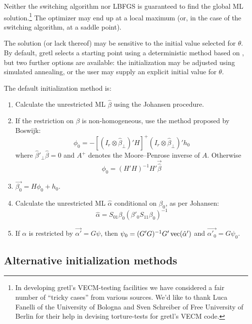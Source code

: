 Neither the switching algorithm nor LBFGS is guaranteed to find the
global ML solution.\footnote{In developing gretl's VECM-testing
facilities we have considered a fair number of ``tricky cases'' from
various sources. We'd like to thank Luca Fanelli of the University of
Bologna and Sven Schreiber of Free University of Berlin for their help
in devising torture-tests for gretl's VECM code.} The optimizer may
end up at a local maximum (or, in the case of the switching algorithm,
at a saddle point).

The solution (or lack thereof) may be sensitive to the initial value
selected for $\theta$.  By default, gretl selects a starting
point using a deterministic method based on \cite{boswijk95}, but two
further options are available: the initialization may be adjusted
using simulated annealing, or the user may supply an explicit initial
value for $\theta$.

The default initialization method is:
%
\begin{enumerate}
\item Calculate the unrestricted ML $\hat{\beta}$ using the
  Johansen procedure.
\item If the restriction on $\beta$ is non-homogeneous, use the
  method proposed by Boswijk:
\begin{equation}
\phi_0 = -[(I_r \otimes \hat{\beta}_{\perp})'H]^+ 
  (I_r \otimes \hat{\beta}_{\perp})' h_0
\end{equation}
where $\hat{\beta}'_{\perp} \hat{\beta} = 0$ and $A^+$ denotes
the Moore--Penrose inverse of $A$.  Otherwise
\begin{equation}
\phi_0 = (H'H)^{-1} H' \vec{\hat{\beta}}
\end{equation}
\item $\vec{\beta_0} = H\phi_0 + h_0$.
\item Calculate the unrestricted ML $\hat{\alpha}$ conditional on
  $\beta_0$, as per Johansen:
\begin{equation}
\label{eq:Jalpha}
\hat{\alpha} = S_{01} \beta_0 (\beta'_0S_{11}\beta_0)^{-1}
\end{equation}
\item If $\alpha$ is restricted by $\vec{\alpha'} = G\psi$, then
  $\psi_0 = (G'G)^{-1}G'\,{\rm vec}(\hat{\alpha}')$ and
  $\vec{\alpha'_0} = G\psi_0$.
\end{enumerate}

\subsection{Alternative initialization methods}
\label{sec:vecm-alt-init}


